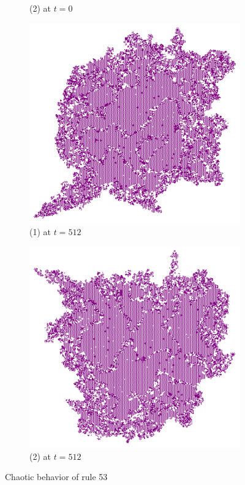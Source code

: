 \documentclass{article}
\begin{document}
\begin{figure}[H]
\begin{subfigure}[b]{0.3\textwidth}
         \caption*{(2) at $t=0$}
     \end{subfigure}
    \break\vspace{5mm}
     \begin{subfigure}[b]{0.48\textwidth}
         \centering
         \includegraphics[width=\textwidth]{graphics/behavior/chaos/chaos-1-2.pdf}
         \caption*{(1) at $t=512$}
     \end{subfigure}
     \begin{subfigure}[b]{0.48\textwidth}
         \centering
         \includegraphics[width=\textwidth]{graphics/behavior/chaos/chaos-2-2.pdf}
         \caption*{(2) at $t=512$}
     \end{subfigure}
     \caption{Chaotic behavior of rule 53}
        \label{fig:chaos}
\end{figure}
\end{document}

